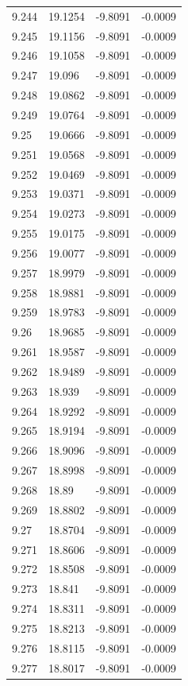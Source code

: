 \begin{tabular}{llll}
9.244 & 19.1254 & -9.8091 & -0.0009 \\
9.245 & 19.1156 & -9.8091 & -0.0009 \\
9.246 & 19.1058 & -9.8091 & -0.0009 \\
9.247 & 19.096 & -9.8091 & -0.0009 \\
9.248 & 19.0862 & -9.8091 & -0.0009 \\
9.249 & 19.0764 & -9.8091 & -0.0009 \\
9.25 & 19.0666 & -9.8091 & -0.0009 \\
9.251 & 19.0568 & -9.8091 & -0.0009 \\
9.252 & 19.0469 & -9.8091 & -0.0009 \\
9.253 & 19.0371 & -9.8091 & -0.0009 \\
9.254 & 19.0273 & -9.8091 & -0.0009 \\
9.255 & 19.0175 & -9.8091 & -0.0009 \\
9.256 & 19.0077 & -9.8091 & -0.0009 \\
9.257 & 18.9979 & -9.8091 & -0.0009 \\
9.258 & 18.9881 & -9.8091 & -0.0009 \\
9.259 & 18.9783 & -9.8091 & -0.0009 \\
9.26 & 18.9685 & -9.8091 & -0.0009 \\
9.261 & 18.9587 & -9.8091 & -0.0009 \\
9.262 & 18.9489 & -9.8091 & -0.0009 \\
9.263 & 18.939 & -9.8091 & -0.0009 \\
9.264 & 18.9292 & -9.8091 & -0.0009 \\
9.265 & 18.9194 & -9.8091 & -0.0009 \\
9.266 & 18.9096 & -9.8091 & -0.0009 \\
9.267 & 18.8998 & -9.8091 & -0.0009 \\
9.268 & 18.89 & -9.8091 & -0.0009 \\
9.269 & 18.8802 & -9.8091 & -0.0009 \\
9.27 & 18.8704 & -9.8091 & -0.0009 \\
9.271 & 18.8606 & -9.8091 & -0.0009 \\
9.272 & 18.8508 & -9.8091 & -0.0009 \\
9.273 & 18.841 & -9.8091 & -0.0009 \\
9.274 & 18.8311 & -9.8091 & -0.0009 \\
9.275 & 18.8213 & -9.8091 & -0.0009 \\
9.276 & 18.8115 & -9.8091 & -0.0009 \\
9.277 & 18.8017 & -9.8091 & -0.0009 \\

\end{tabular}
